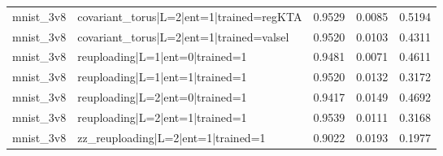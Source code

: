 \begin{table}
\begin{tabular}{llrrr}
mnist\_3v8 & covariant\_torus|L=2|ent=1|trained=regKTA & 0.9529 & 0.0085 & 0.5194 \\
mnist\_3v8 & covariant\_torus|L=2|ent=1|trained=valsel & 0.9520 & 0.0103 & 0.4311 \\
mnist\_3v8 & reuploading|L=1|ent=0|trained=1 & 0.9481 & 0.0071 & 0.4611 \\
mnist\_3v8 & reuploading|L=1|ent=1|trained=1 & 0.9520 & 0.0132 & 0.3172 \\
mnist\_3v8 & reuploading|L=2|ent=0|trained=1 & 0.9417 & 0.0149 & 0.4692 \\
mnist\_3v8 & reuploading|L=2|ent=1|trained=1 & 0.9539 & 0.0111 & 0.3168 \\
mnist\_3v8 & zz\_reuploading|L=2|ent=1|trained=1 & 0.9022 & 0.0193 & 0.1977 \\
\bottomrule
\end{tabular}
\end{table}
